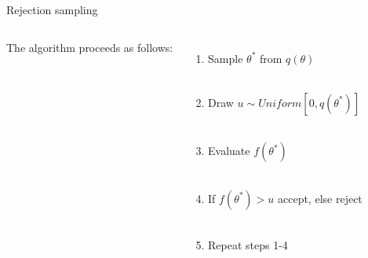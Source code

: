 \documentclass[compress]{beamer}
\begin{document}
\begin{frame}[label=sec-5-8]{Rejection sampling}
\begin{columns}[c]
The algorithm proceeds as follows:\\
\begin{enumerate}
\item Sample $\theta^*$ from $q(\theta)$ \\~\\
\item Draw $u \sim Uniform[0, q(\theta^*)]$ \\~\\
\item Evaluate $f(\theta^*)$ \\~\\
\item If $f(\theta^*) > u$ accept, else reject \\~\\
\item Repeat steps 1-4
\end{enumerate}
\end{columns}
\end{frame}
\end{document}

